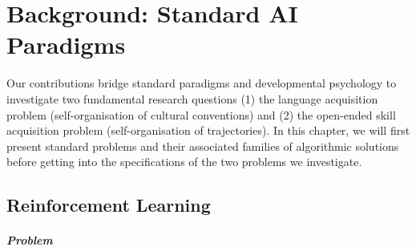 \chapter{Background: Standard AI Paradigms}
\label{chap:backgroud}
\adjustmtc
\minitoc

Our contributions bridge standard \ai paradigms and developmental psychology to investigate two fundamental research questions  (1) the language acquisition problem (self-organisation of cultural conventions) and (2) the open-ended skill acquisition problem (self-organisation of trajectories). In this chapter, we will first present standard \ai problems and their associated families of algorithmic solutions before getting into the specifications of the two problems we investigate.

\section{Reinforcement Learning}

\label{sec:background_rl}

\paragraph{Problem}

